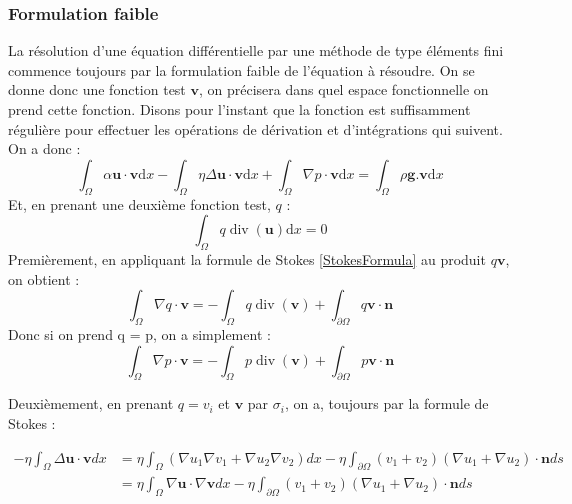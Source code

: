 \subsubsection{Formulation faible}
La résolution d'une équation différentielle par une méthode de type éléments fini commence toujours par la formulation faible de l'équation à résoudre.
On se donne donc une fonction test $\mathbf{v}$, on précisera dans quel espace fonctionnelle on prend cette fonction. Disons pour l'instant que la fonction est suffisamment régulière pour effectuer les opérations de dérivation et d'intégrations qui suivent. \\
On a donc : 
\begin{equation}
\int_{\Omega} \alpha \mathbf{u} \cdot \mathbf{v} \mathrm{d} x-\int_{\Omega} \eta \Delta \mathbf{u}\cdot \mathbf{v} \mathrm{d} x+\int_{\Omega} \nabla p \cdot \mathbf{v} \mathrm{d} x=\int_{\Omega} \rho  \mathbf{g}. \mathbf{v} \mathrm{d} x
\end{equation}
Et, en prenant une deuxième fonction test, $q$ : 
\begin{equation}
\int_{\Omega} q \operatorname{div} (\mathbf{u}) \mathrm{d} x = 0
\end{equation}
Premièrement, en appliquant la formule de Stokes \ref{StokesFormula} au produit $q \mathbf{v}$, on obtient : 
\begin{equation}
\int_{\Omega} \nabla q \cdot \mathbf{v}=-\int_{\Omega} q \operatorname{div}(\mathbf{v})+\int_{\partial \Omega} q \mathbf{v} \cdot \mathbf{n}
\end{equation}
Donc si on prend q = p, on a simplement : 
\begin{equation}
\int_{\Omega} \nabla p \cdot \mathbf{v}=-\int_{\Omega} p \operatorname{div}(\mathbf{v})+\int_{\partial \Omega} p \mathbf{v} \cdot \mathbf{n}
\end{equation}

Deuxièmement, en prenant $q=v_i$ et $\mathbf{v}$ par $\sigma_i$, on a, toujours par la formule de Stokes : 

\begin{equation}
\begin{aligned}
-\eta \int_{\Omega} \Delta \mathbf{u} \cdot \mathbf{v}dx &=\eta \int_{\Omega}\left(\nabla u_{1} \nabla v_{1}+\nabla u_{2} \nabla v_{2}\right)dx-\eta \int_{\partial \Omega}\left(v_{1}+v_{2}\right)\left(\nabla u_{1}+\nabla u_{2}\right) \cdot \mathbf{n} ds \\
&=\eta \int_{\Omega} \nabla \mathbf{u} \cdot \nabla \mathbf{v}dx-\eta \int_{\partial \Omega}\left(v_{1}+v_{2}\right)\left(\nabla u_{1}+\nabla u_{2}\right) \cdot \mathbf{n}ds
\end{aligned}
\end{equation}
 
